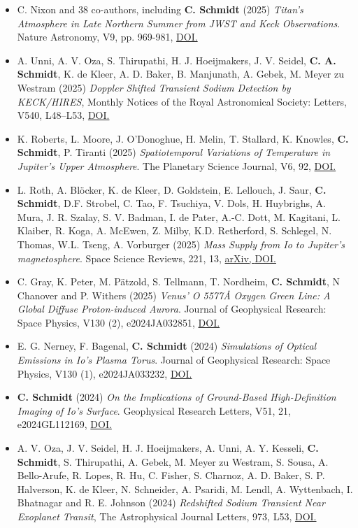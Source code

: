 \documentclass[12pt]{report}
\begin{document}
\begin{itemize}
  \item C. Nixon and 38 co-authors, including \textbf{C. Schmidt} (2025) \textit{Titan's Atmosphere in Late Northern Summer from JWST and Keck Observations}. Nature Astronomy, V9, pp. 969-981, \href{https://doi.org/10.1038/s41550-025-02537-3}{DOI.}
  \item A. Unni, A. V. Oza, S. Thirupathi, H. J. Hoeijmakers, J. V. Seidel, \textbf{C. A. Schmidt}, K. de Kleer, A. D. Baker, B. Manjunath, A. Gebek, M. Meyer zu Westram (2025) \textit{Doppler Shifted Transient Sodium Detection by KECK/HIRES}, Monthly Notices of the Royal Astronomical Society: Letters, V540, L48–L53, \href{https://doi.org/10.1093/mnrasl/slaf031}{DOI.}
  \item K. Roberts, L. Moore, J. O'Donoghue, H. Melin, T. Stallard, K. Knowles, \textbf{C. Schmidt}, P. Tiranti (2025) \textit{Spatiotemporal Variations of Temperature in Jupiter's Upper Atmosphere}. The Planetary Science Journal, V6, 92, \href{https://doi.org/10.3847/PSJ/adc09b}{DOI.}
  \item L. Roth, A. Bl\"ocker, K. de Kleer, D. Goldstein, E. Lellouch, J. Saur, \textbf{C. Schmidt}, D.F. Strobel, C. Tao, F. Tsuchiya, V. Dols, H. Huybrighs, A. Mura, J. R. Szalay, S. V. Badman, I. de Pater, A.-C. Dott, M. Kagitani, L. Klaiber, R. Koga, A. McEwen, Z. Milby, K.D. Retherford, S. Schlegel, N. Thomas, W.L. Tseng, A. Vorburger (2025) \textit{Mass Supply from Io to Jupiter's magnetosphere}. Space Science Reviews, 221, 13, \href{https://doi.org/10.48550/arXiv.2403.13970}{arXiv, }\href{https://doi.org/10.1007/s11214-025-01137-x}{DOI.}
  \item C. Gray, K. Peter, M. P\"atzold, S. Tellmann, T. Nordheim, \textbf{C. Schmidt}, N Chanover and P. Withers (2025) \textit{Venus' O 5577{\AA} Oxygen Green Line: A Global Diffuse Proton-induced Aurora}. Journal of Geophysical Research: Space Physics, V130 (2), e2024JA032851, \href{https://doi.org/10.1029/2024JA032851}{DOI.}   
  \item E. G. Nerney, F. Bagenal, \textbf{C. Schmidt} (2024) \textit{Simulations of Optical Emissions in Io's Plasma Torus}. Journal of Geophysical Research: Space Physics, V130 (1), e2024JA033232, \href{https://doi.org/10.1029/2024JA033232}{DOI.}   
  \item \textbf{C. Schmidt} (2024) \textit{On the Implications of Ground-Based High-Definition Imaging of Io's Surface}. Geophysical Research Letters, V51, 21, e2024GL112169, \href{https://doi.org/10.1029/2024GL112169}{DOI.}   
  \item A. V. Oza, J. V. Seidel, H. J. Hoeijmakers, A. Unni, A. Y. Kesseli, \textbf{C. Schmidt}, S. Thirupathi, A. Gebek, M. Meyer zu Westram, S. Sousa, A. Bello-Arufe, R. Lopes, R. Hu, C. Fisher, S. Charnoz, A. D. Baker, S. P. Halverson, K. de Kleer, N. Schneider, A. Psaridi, M. Lendl, A. Wyttenbach, I. Bhatnagar and R. E. Johnson (2024) \textit{Redshifted Sodium Transient Near Exoplanet Transit}, The Astrophysical Journal Letters, 973, L53, \href{https://doi.org/10.3847/2041-8213/ad6b29}{DOI.} 

\end{itemize}
\end{document}
